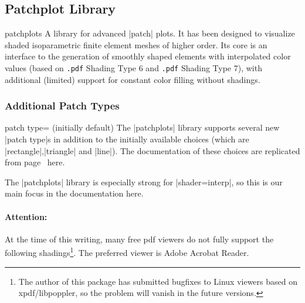\subsection{Patchplot Library}
\label{sec:lib:patchplots}
\begin{pgfplotslibrary}{patchplots}
	A library for advanced |patch| plots. It has been designed to visualize shaded isoparametric finite element meshes of higher order. Its core is an interface to the generation of smoothly shaped elements with interpolated color values (based on \texttt{.pdf} Shading Type 6 and \texttt{.pdf} Shading Type 7), with additional (limited) support for constant color filling without shadings.

\subsubsection{Additional Patch Types}
\begin{pgfplotskey}{patch type= (initially default)}
	The |patchplots| library supports several new |patch type|s in addition to the initially available choices (which are |rectangle|,|triangle| and |line|). The documentation of these choices are replicated from page~\pageref{key:patch:type} here.

	The |patchplots| library is especially strong for |shader=interp|, so this is our main focus in the documentation here.

	\paragraph{Attention:} At the time of this writing, many free pdf viewers do not fully support the following shadings\footnote{The author of this package has submitted bugfixes to Linux viewers based on xpdf/libpoppler, so the problem will vanish in the future versions.}. The preferred viewer is Adobe Acrobat Reader.


\end{pgfplotskey}
\end{pgfplotslibrary}
